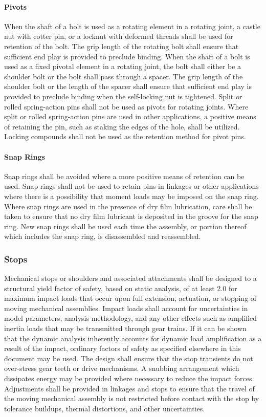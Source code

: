 \documentclass[12pt]{article}
\begin{document}
\paragraph{Pivots} %
When the shaft of a bolt is used as a rotating element in a rotating joint, a castle nut with cotter pin, or a locknut with deformed threads shall be used for retention of the bolt. 
The grip length of the rotating bolt shall ensure that sufficient end play is provided to preclude binding. 
When the shaft of a bolt is used as a fixed pivotal element in a rotating joint, the bolt shall either be a shoulder bolt or the bolt shall pass through a spacer. 
The grip length of the shoulder bolt or the length of the spacer shall ensure that sufficient end play is provided to preclude binding when the self-locking nut is tightened. 
Split or rolled spring-action pins shall not be used as pivots for rotating joints. 
Where split or rolled spring-action pins are used in other applications, a positive means of retaining the pin, such as staking the edges of the hole, shall be utilized. 
Locking compounds shall not be used as the retention method for pivot pins.

\paragraph{Snap Rings} %
Snap rings shall be avoided where a more positive means of retention can be used. 
Snap rings shall not be used to retain pins in linkages or other applications where there is a possibility that moment loads may be imposed on the snap ring. 
Where snap rings are used in the presence of dry film lubrication, care shall be taken to ensure that no dry film lubricant is deposited in the groove for the snap ring. 
New snap rings shall be used each time the assembly, or portion thereof which includes the snap ring, is disassembled and reassembled.

\subsubsection{Stops} %
Mechanical stops or shoulders and associated attachments shall be designed to a structural yield factor of safety, based on static analysis, of at least 2.0 for maximum impact loads that occur upon full extension, actuation, or stopping of moving mechanical assemblies. 
Impact loads shall account for uncertainties in model parameters, analysis methodology, and any other effects such as amplified inertia loads that may be transmitted through gear trains. 
If it can be shown that the dynamic analysis inherently accounts for dynamic load amplification as a result of the impact, ordinary factors of safety as specified elsewhere in this document may be used.
The design shall ensure that the stop transients do not over-stress gear teeth or drive mechanisms. 
A snubbing arrangement which dissipates energy may be provided where necessary to reduce the impact forces. 
Adjustments shall be provided in linkages and stops to ensure that the travel of the moving mechanical assembly is not restricted before contact with the stop by tolerance buildups, thermal distortions, and other uncertainties.
\end{document}
